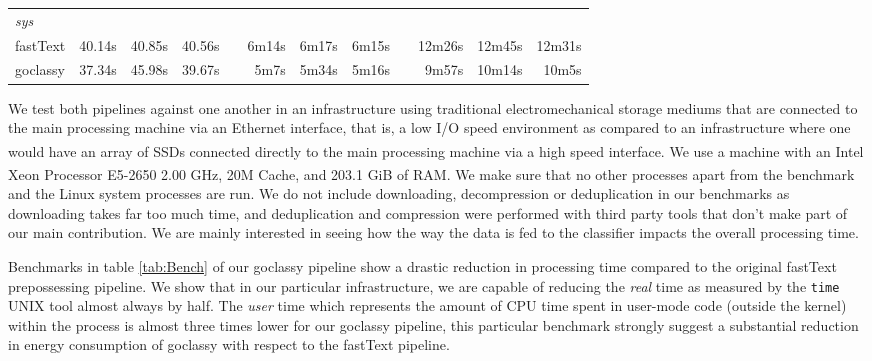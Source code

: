 \begin{table*}[ht!]
\begin{tabular}{lrrrcrrrcrrr}
        \emph{sys}                                                                                                                                                                                                                                                                             \\
        fastText & 40.14s                       & 40.85s                  & 40.56s                        &             & 6m14s                         & 6m17s                   & 6m15s                    &  & 12m26s                  & 12m45s                  & 12m31s                   \\
        goclassy & 37.34s                       & 45.98s                  & 39.67s                        &             & 5m7s                          & 5m34s                   & 5m16s                    &  & 9m57s                   & 10m14s                  & 10m5s                    \\
        \bottomrule
    \end{tabular}
    \caption{Benchmarks are done using the UNIX \texttt{time} tool, are repeated 10 times each and are done for random samples of 10, 100 and 200 WET files. Only the classifying and filtering part are benchmarked. The table shows the minimum, maximum and mean time for the user, real and sys time over the 10 runs. Here ``fastText'' is used as short for the pipeline.}
    \label{tab:Bench}
\end{table*}

We test both pipelines against one another in an infrastructure using traditional electromechanical storage mediums that are connected to the main processing machine via an Ethernet interface, that is, a low I/O speed environment as compared to an infrastructure where one would have an array of SSDs connected directly to the main processing machine via a high speed interface. We use a machine with an Intel\textsuperscript{\textregistered} Xeon\textsuperscript{\textregistered} Processor E5-2650 2.00 GHz, 20M Cache, and 203.1 GiB of RAM. We make sure that no other processes apart from the benchmark and the Linux system processes are run. We do not include downloading, decompression or deduplication in our benchmarks as downloading takes far too much time, and deduplication and compression were performed with third party tools that don't make part of our main contribution. We are mainly interested in seeing how the way the data is fed to the classifier impacts the overall processing time.

Benchmarks in table \ref{tab:Bench} of our goclassy pipeline show a drastic reduction in processing time compared to the original fastText prepossessing pipeline. We show that in our particular infrastructure, we are capable of reducing the \emph{real} time as measured by the \texttt{time} UNIX tool almost always by half. The \emph{user} time which represents the amount of CPU time spent in user-mode code (outside the kernel) within the process is almost three times lower for our goclassy pipeline, this particular benchmark strongly suggest a substantial reduction in energy consumption of goclassy with respect to the fastText pipeline.

